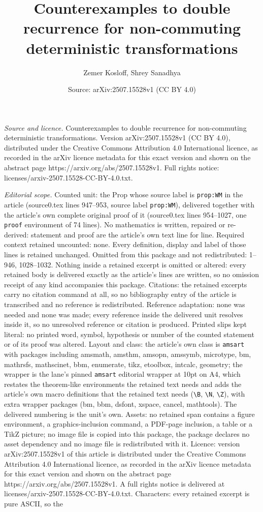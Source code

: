 \documentclass[10pt,a4paper]{amsart}
\title[Counterexamples to double recurrence for non-commuting deter]{Counterexamples to double recurrence for non-commuting deterministic transformations}
\author{Zemer Kosloff, Shrey Sanadhya}
\date{Source: arXiv:2507.15528v1 (CC BY 4.0)}
\begin{document}
\maketitle

\noindent\emph{Source and licence.} Counterexamples to double recurrence for non-commuting deterministic transformations. Version arXiv:2507.15528v1 (CC BY 4.0), distributed under the Creative Commons Attribution 4.0 International licence, as recorded in the arXiv licence metadata for this exact version and shown on the abstract page https://arxiv.org/abs/2507.15528v1. Full rights notice: licenses/arxiv-2507.15528-CC-BY-4.0.txt.\par\smallskip

\noindent\textit{Editorial scope.} Counted unit: the Prop whose source label is \texttt{prop:WM} in the article (source0.tex lines 947--953, source label \texttt{prop:WM}), delivered together with the article's own complete original proof of it (source0.tex lines 954--1027, one \texttt{proof} environment of 74 lines). No mathematics is written, repaired or re-derived: statement and proof are the article's own text line for line. Required context retained uncounted: none. Every definition, display and label of those lines is retained unchanged. Omitted from this package and not redistributed: 1--946, 1028--1032. Nothing inside a retained excerpt is omitted or altered: every retained body is delivered exactly as the article's lines are written, so no omission receipt of any kind accompanies this package. Citations: the retained excerpts carry no citation command at all, so no bibliography entry of the article is transcribed and no reference is redistributed. Reference adaptation: none was needed and none was made; every reference inside the delivered unit resolves inside it, so no unresolved reference or citation is produced. Printed slips kept literal: no printed word, symbol, hypothesis or number of the counted statement or of its proof was altered. Layout and class: the article's own class is \texttt{amsart} with packages including amsmath, amsthm, amsopn, amssymb, microtype, bm, mathrsfs, mathscinet, bbm, enumerate, tikz, etoolbox, intcalc, geometry; the wrapper is the lane's pinned \texttt{amsart} editorial wrapper at 10pt on A4, which restates the theorem-like environments the retained text needs and adds the article's own macro definitions that the retained text needs (\texttt{\textbackslash B}, \texttt{\textbackslash N}, \texttt{\textbackslash Z}), with extra wrapper packages (bm, bbm, dsfont, xspace, cancel, mathtools). The delivered numbering is the unit's own. Assets: no retained span contains a figure environment, a graphics-inclusion command, a PDF-page inclusion, a table or a TikZ picture; no image file is copied into this package, the package declares no asset dependency and no image file is redistributed with it. Licence: version arXiv:2507.15528v1 of this article is distributed under the Creative Commons Attribution 4.0 International licence, as recorded in the arXiv licence metadata for this exact version and shown on the abstract page https://arxiv.org/abs/2507.15528v1. A full rights notice is delivered at licenses/arxiv-2507.15528-CC-BY-4.0.txt. Characters: every retained excerpt is pure ASCII, so the 
\end{document}
